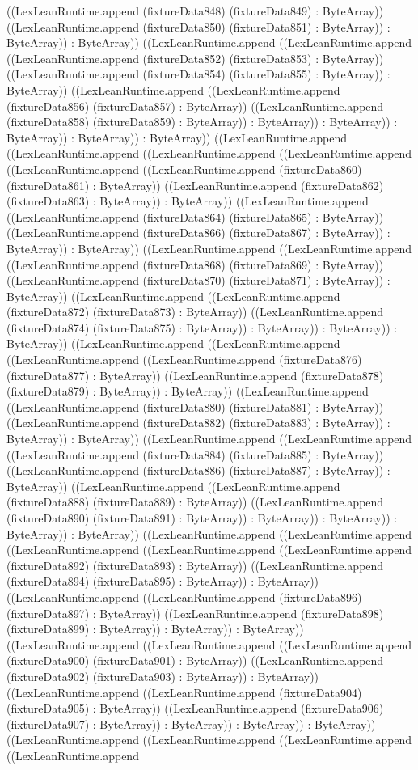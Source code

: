 \documentclass[11pt]{article}
\begin{document}
((LexLeanRuntime.append (fixtureData848) (fixtureData849) : ByteArray)) ((LexLeanRuntime.append (fixtureData850) (fixtureData851) : ByteArray)) : ByteArray)) : ByteArray)) ((LexLeanRuntime.append ((LexLeanRuntime.append ((LexLeanRuntime.append (fixtureData852) (fixtureData853) : ByteArray)) ((LexLeanRuntime.append (fixtureData854) (fixtureData855) : ByteArray)) : ByteArray)) ((LexLeanRuntime.append ((LexLeanRuntime.append (fixtureData856) (fixtureData857) : ByteArray)) ((LexLeanRuntime.append (fixtureData858) (fixtureData859) : ByteArray)) : ByteArray)) : ByteArray)) : ByteArray)) : ByteArray)) : ByteArray)) ((LexLeanRuntime.append ((LexLeanRuntime.append ((LexLeanRuntime.append ((LexLeanRuntime.append ((LexLeanRuntime.append ((LexLeanRuntime.append (fixtureData860) (fixtureData861) : ByteArray)) ((LexLeanRuntime.append (fixtureData862) (fixtureData863) : ByteArray)) : ByteArray)) ((LexLeanRuntime.append ((LexLeanRuntime.append (fixtureData864) (fixtureData865) : ByteArray)) ((LexLeanRuntime.append (fixtureData866) (fixtureData867) : ByteArray)) : ByteArray)) : ByteArray)) ((LexLeanRuntime.append ((LexLeanRuntime.append ((LexLeanRuntime.append (fixtureData868) (fixtureData869) : ByteArray)) ((LexLeanRuntime.append (fixtureData870) (fixtureData871) : ByteArray)) : ByteArray)) ((LexLeanRuntime.append ((LexLeanRuntime.append (fixtureData872) (fixtureData873) : ByteArray)) ((LexLeanRuntime.append (fixtureData874) (fixtureData875) : ByteArray)) : ByteArray)) : ByteArray)) : ByteArray)) ((LexLeanRuntime.append ((LexLeanRuntime.append ((LexLeanRuntime.append ((LexLeanRuntime.append (fixtureData876) (fixtureData877) : ByteArray)) ((LexLeanRuntime.append (fixtureData878) (fixtureData879) : ByteArray)) : ByteArray)) ((LexLeanRuntime.append ((LexLeanRuntime.append (fixtureData880) (fixtureData881) : ByteArray)) ((LexLeanRuntime.append (fixtureData882) (fixtureData883) : ByteArray)) : ByteArray)) : ByteArray)) ((LexLeanRuntime.append ((LexLeanRuntime.append ((LexLeanRuntime.append (fixtureData884) (fixtureData885) : ByteArray)) ((LexLeanRuntime.append (fixtureData886) (fixtureData887) : ByteArray)) : ByteArray)) ((LexLeanRuntime.append ((LexLeanRuntime.append (fixtureData888) (fixtureData889) : ByteArray)) ((LexLeanRuntime.append (fixtureData890) (fixtureData891) : ByteArray)) : ByteArray)) : ByteArray)) : ByteArray)) : ByteArray)) ((LexLeanRuntime.append ((LexLeanRuntime.append ((LexLeanRuntime.append ((LexLeanRuntime.append ((LexLeanRuntime.append (fixtureData892) (fixtureData893) : ByteArray)) ((LexLeanRuntime.append (fixtureData894) (fixtureData895) : ByteArray)) : ByteArray)) ((LexLeanRuntime.append ((LexLeanRuntime.append (fixtureData896) (fixtureData897) : ByteArray)) ((LexLeanRuntime.append (fixtureData898) (fixtureData899) : ByteArray)) : ByteArray)) : ByteArray)) ((LexLeanRuntime.append ((LexLeanRuntime.append ((LexLeanRuntime.append (fixtureData900) (fixtureData901) : ByteArray)) ((LexLeanRuntime.append (fixtureData902) (fixtureData903) : ByteArray)) : ByteArray)) ((LexLeanRuntime.append ((LexLeanRuntime.append (fixtureData904) (fixtureData905) : ByteArray)) ((LexLeanRuntime.append (fixtureData906) (fixtureData907) : ByteArray)) : ByteArray)) : ByteArray)) : ByteArray)) ((LexLeanRuntime.append ((LexLeanRuntime.append ((LexLeanRuntime.append ((LexLeanRuntime.append 
\end{document}
